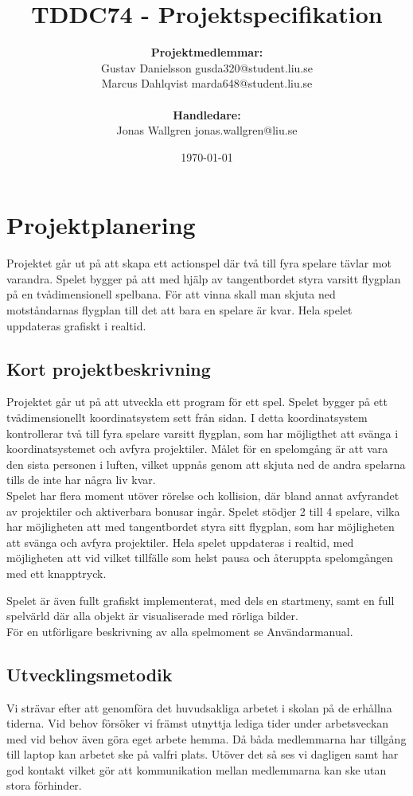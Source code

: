 \documentclass[12pt,a4paper]{article}
\title{TDDC74 -  Projektspecifikation}
\author{\textbf{Projektmedlemmar:}\\
Gustav Danielsson \small{gusda320@student.liu.se}\\
Marcus Dahlqvist \small{marda648@student.liu.se}\\ 
\bigskip\\ \textbf{Handledare:}\\
Jonas Wallgren {\small jonas.wallgren@liu.se}}
\date{\today}
\begin{document}
\maketitle
\newpage

\tableofcontents
\newpage

\section{Projektplanering}
Projektet går ut på att skapa ett actionspel där två till fyra spelare tävlar mot varandra. Spelet bygger på att med hjälp av tangentbordet styra varsitt flygplan på en tvådimensionell spelbana. För att vinna skall man skjuta ned motståndarnas flygplan till det att bara en spelare är kvar. Hela spelet uppdateras grafiskt i realtid.

\subsection{Kort projektbeskrivning}
Projektet går ut på att utveckla ett program för ett spel. Spelet bygger på ett tvådimensionellt koordinatsystem sett från sidan. I detta koordinatsystem kontrollerar två till fyra spelare varsitt flygplan, som har möjligthet att svänga i koordinatsystemet och avfyra projektiler. Målet för en spelomgång är att vara den sista personen i luften, vilket uppnås genom att skjuta ned de andra spelarna tills de inte har några liv kvar.\\

Spelet har flera moment utöver rörelse och kollision, där bland annat avfyrandet av projektiler och aktiverbara bonusar ingår.
Spelet stödjer 2 till 4 spelare, vilka har möjligheten att med tangentbordet styra sitt flygplan, som har möjligheten att svänga och avfyra projektiler.
Hela spelet uppdateras i realtid, med möjligheten att vid vilket tillfälle som helst pausa och återuppta spelomgången med ett knapptryck.

Spelet är även fullt grafiskt implementerat, med dels en startmeny, samt en full spelvärld där alla objekt är visualiserade med rörliga bilder.\\

För en utförligare beskrivning av alla spelmoment se Användarmanual.

\subsection{Utvecklingsmetodik}
Vi strävar efter att genomföra det huvudsakliga arbetet i skolan på de erhållna tiderna. Vid behov försöker vi främst utnyttja lediga tider under arbetsveckan med vid behov även göra eget arbete hemma. Då båda medlemmarna har tillgång till laptop kan arbetet ske på valfri plats. Utöver det så ses vi dagligen samt har god kontakt vilket gör att kommunikation mellan medlemmarna kan ske utan stora förhinder. \\
\end{document}
